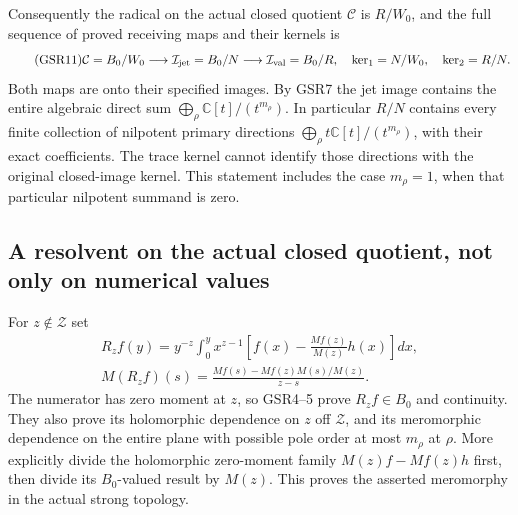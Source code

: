 Consequently the radical on the actual
closed quotient $\mathcal C$ is $R/W_0$,
and the full sequence of proved receiving
maps and their kernels is
\begin{equation}\tag{GSR11}
 \mathcal C=B_0/W_0
    \longrightarrow\mathcal I_{\rm jet}=B_0/N
    \longrightarrow\mathcal I_{\rm val}=B_0/R,
 \quad
 \ker_1=N/W_0,\quad \ker_2=R/N .
\end{equation}
Both maps are onto their specified images.
By GSR7 the jet image contains the entire
algebraic direct sum
$\bigoplus_\rho\mathbb C[t]/(t^{m_\rho})$.
In particular $R/N$ contains every finite
collection of nilpotent primary directions
$\bigoplus_\rho t\mathbb C[t]/(t^{m_\rho})$,
with their exact coefficients.
The trace kernel cannot identify those
directions with the original closed-image
kernel. This statement includes the case
$m_\rho=1$, when that particular nilpotent
summand is zero.

\subsection{A resolvent on the actual closed quotient, not only on numerical values}

For $z\notin\mathcal Z$ set
\begin{equation}\tag{GSR12}
 \begin{gathered}
 R_zf(y)=y^{-z}\int_0^y x^{z-1}
       \left[f(x)-\frac{Mf(z)}{M(z)}h(x)\right]dx,\\
 M(R_zf)(s)=
      \frac{Mf(s)-Mf(z)M(s)/M(z)}{z-s}.
 \end{gathered}
\end{equation}
The numerator has zero moment at $z$, so
GSR4--5 prove $R_zf\in B_0$ and continuity.
They also prove its holomorphic dependence
on $z$ off $\mathcal Z$, and its meromorphic
dependence on the entire plane with possible
pole order at most $m_\rho$ at $\rho$.
More explicitly divide the holomorphic
zero-moment family $M(z)f-Mf(z)h$ first,
then divide its $B_0$-valued result by $M(z)$.
This proves the asserted meromorphy in
the actual strong topology.

